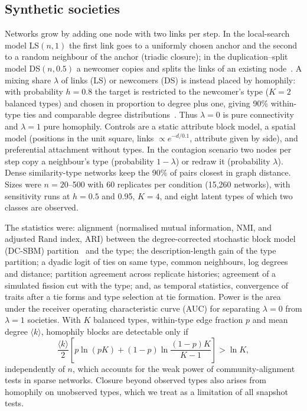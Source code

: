 \documentclass[11pt]{article}
\begin{document}
\subsection{Synthetic societies}
Networks grow by adding one node with two links per step. In the local-search model LS$(n,1)$ the first
link goes to a uniformly chosen anchor and the second to a random neighbour of the anchor (triadic
closure); in the duplication--split model DS$(n,0.5)$ a newcomer copies and splits the links of an
existing node~\cite{VazquezBook}. A mixing share $\lambda$ of links (LS) or newcomers (DS) is instead
placed by homophily: with probability $h=0.8$ the target is restricted to the newcomer's type ($K=2$
balanced types) and chosen in proportion to degree plus one, giving 90\% within-type ties and comparable
degree distributions~\cite{Karimi2018}. Thus $\lambda=0$ is pure connectivity and $\lambda=1$ pure
homophily. Controls are a static attribute block model, a spatial model (positions in the unit square,
links $\propto e^{-d/0.1}$, attribute given by side), and preferential attachment without types. In the
contagion scenario two nodes per step copy a neighbour's type (probability $1-\lambda$) or redraw it
(probability $\lambda$). Dense similarity-type networks keep the 90\% of pairs closest in graph distance.
Sizes were $n=20$--500 with 60 replicates per condition (15,260 networks), with sensitivity runs at
$h=0.5$ and 0.95, $K=4$, and eight latent types of which two classes are observed.

The statistics were: alignment (normalised mutual information, NMI, and adjusted Rand index, ARI)
between the degree-corrected stochastic block model (DC-SBM) partition~\cite{Peixoto2014} and the type;
the description-length gain of the type partition; a dyadic logit of ties on same type, common
neighbours, log degrees and distance; partition agreement across replicate histories; agreement of a
simulated fission cut with the type; and, as temporal statistics, convergence of traits after a tie forms
and type selection at tie formation. Power is the area under the receiver operating characteristic curve
(AUC) for separating $\lambda=0$ from $\lambda=1$ societies. With $K$ balanced types, within-type edge
fraction $p$ and mean degree $\langle k\rangle$, homophily blocks are detectable only if
\begin{equation}
\frac{\langle k\rangle}{2}\left[p\ln(pK)+(1-p)\ln\frac{(1-p)K}{K-1}\right]>\ln K ,
\label{eq:detect}
\end{equation}
independently of $n$, which accounts for the weak power of community-alignment tests in sparse networks.
Closure beyond observed types also arises from homophily on unobserved types, which we treat as a
limitation of all snapshot tests.
\end{document}
